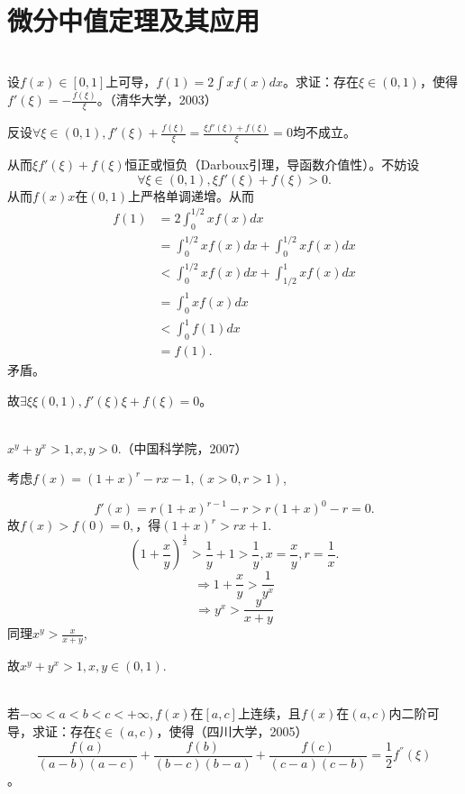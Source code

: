   \section{微分中值定理及其应用}
  \begin{example}
  \hfill\\
  设$f(x)\in[0,1]$上可导，$f(1)=2\int xf(x)dx$。求证：存在$\xi\in(0,1)$，使得$f'(\xi)=-\frac{f(\xi)}{\xi}$。（清华大学，2003）
  
  
  反设$\forall\xi\in(0,1),f'(\xi)+\frac{f(\xi)}{\xi}=\frac{\xi f'(\xi)+f(\xi)}{\xi}=0$均不成立。
  
  从而$\xi f'(\xi)+f(\xi)$恒正或恒负（Darboux引理，导函数介值性）。不妨设
  $$\forall\xi\in(0,1),\xi f'(\xi)+f(\xi)>0.$$
  从而$f(x)x$在$(0,1)$上严格单调递增。从而
  \[
  \begin{aligned}
  f(1)&=2\int_0^{1/2}xf(x)dx\\
  &=\int_0^{1/2}xf(x)dx+\int_0^{1/2}xf(x)dx\\
  &<\int_0^{1/2}xf(x)dx+\int_{1/2}^1xf(x)dx\\
  &=\int_0^1xf(x)dx\\
  &<\int_0^1f(1)dx\\
  &=f(1).
  \end{aligned}
  \]
  矛盾。
  
  故$\exists\xi\xi(0,1),f'(\xi)\xi+f(\xi)=0$。
  \end{example}
  \begin{example}
  \hfill\\
  $x^y+y^x>1,x,y>0$.（中国科学院，2007）
  
  
  考虑$f(x)=(1+x)^r-rx-1,(x>0,r>1)$,
  
  $$f'(x)=r(1+x)^{r-1}-r>r(1+x)^0-r=0.$$
  故$f(x)>f(0)=0,$，得$(1+x)^r>rx+1.$
  $$(1+\frac{x}{y})^{\frac1x}>\frac1y+1>\frac1y,x=\frac xy,r=\frac1x.$$
  $$\Longrightarrow 1+\frac xy>\frac{1}{y^x}$$
  $$\Longrightarrow y^x>\frac{y}{x+y}$$
  同理$x^y>\frac{x}{x+y},$
  
  故$x^y+y^x>1,x,y\in(0,1).$ 
  \end{example}
  \begin{example}
  \hfill\\
   若$-\infty<a<b<c<+\infty,f(x)$在$[a,c]$上连续，且$f(x)$在$(a,c)$内二阶可导，求证：存在$\xi\in(a,c)$，使得（四川大学，2005）$$\frac{f(a)}{(a-b)(a-c)}+\frac{f(b)}{(b-c)(b-a)}+\frac{f(c)}{(c-a)(c-b)}=\frac12f^{''}(\xi)$$。
\end{example}
